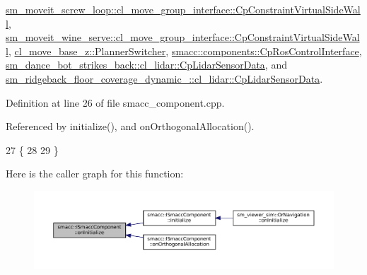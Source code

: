 \hyperlink{classsm__moveit__screw__loop_1_1cl__move__group__interface_1_1CpConstraintVirtualSideWall_a34f0babfdf0304d34cd42e77800f1df0}{sm\+\_\+moveit\+\_\+screw\+\_\+loop\+::cl\+\_\+move\+\_\+group\+\_\+interface\+::\+Cp\+Constraint\+Virtual\+Side\+Wall}, \hyperlink{classsm__moveit__wine__serve_1_1cl__move__group__interface_1_1CpConstraintVirtualSideWall_ac15d37921d1969b4be0f5ea3e2345c24}{sm\+\_\+moveit\+\_\+wine\+\_\+serve\+::cl\+\_\+move\+\_\+group\+\_\+interface\+::\+Cp\+Constraint\+Virtual\+Side\+Wall}, \hyperlink{classcl__move__base__z_1_1PlannerSwitcher_a36bc2b9788f03a1ca02b954c625ef4c5}{cl\+\_\+move\+\_\+base\+\_\+z\+::\+Planner\+Switcher}, \hyperlink{classsmacc_1_1components_1_1CpRosControlInterface_a469bdb5723a9ab66d6b0a7908d5891bf}{smacc\+::components\+::\+Cp\+Ros\+Control\+Interface}, \hyperlink{classsm__dance__bot__strikes__back_1_1cl__lidar_1_1CpLidarSensorData_a138dad9a855d5d4962410374d0a29d30}{sm\+\_\+dance\+\_\+bot\+\_\+strikes\+\_\+back\+::cl\+\_\+lidar\+::\+Cp\+Lidar\+Sensor\+Data}, and \hyperlink{classsm__ridgeback__floor__coverage__dynamic__1_1_1cl__lidar_1_1CpLidarSensorData_a36e459ab99589f934a85a7106b409d9a}{sm\+\_\+ridgeback\+\_\+floor\+\_\+coverage\+\_\+dynamic\+\_\+::cl\+\_\+lidar\+::\+Cp\+Lidar\+Sensor\+Data}.



Definition at line 26 of file smacc\+\_\+component.\+cpp.



Referenced by initialize(), and on\+Orthogonal\+Allocation().


\begin{DoxyCode}
27 \{
28 
29 \}
\end{DoxyCode}
Here is the caller graph for this function\+:
\nopagebreak
\begin{figure}[H]
\begin{center}
\leavevmode
\includegraphics[width=350pt]{classsmacc_1_1ISmaccComponent_ae6f71d008db12553912e9436184b9e65_icgraph}
\end{center}
\end{figure}
\mbox{\label{classsmacc_1_1ISmaccComponent_a709535b31a309e95a89ec3e4f4c54f30}} 

